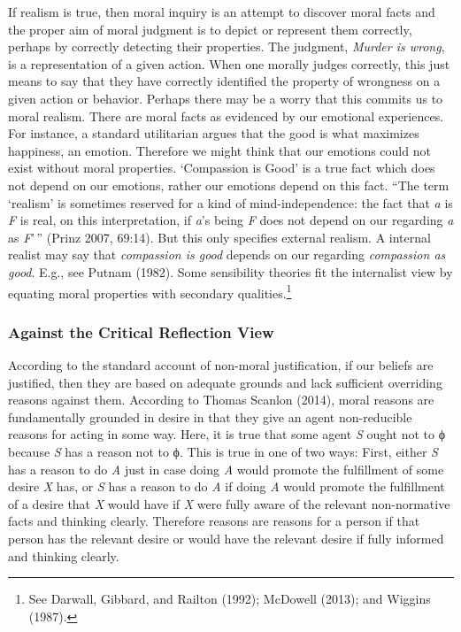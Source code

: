 \documentclass[
  letterpaper,
  DIV=11,
  numbers=noendperiod]{scrartcl}
\theoremstyle{remark}
\begin{document}
If realism is true, then moral inquiry is an attempt to discover moral
facts and the proper aim of moral judgment is to depict or represent
them correctly, perhaps by correctly detecting their properties. The
judgment, \emph{Murder is wrong}, is a representation of a given action.
When one morally judges correctly, this just means to say that they have
correctly identified the property of wrongness on a given action or
behavior. Perhaps there may be a worry that this commits us to moral
realism. There are moral facts as evidenced by our emotional
experiences. For instance, a standard utilitarian argues that the good
is what maximizes happiness, an emotion. Therefore we might think that
our emotions could not exist without moral properties. `Compassion is
Good' is a true fact which does not depend on our emotions, rather our
emotions depend on this fact. ``The term `realism' is sometimes reserved
for a kind of mind-independence: the fact that \emph{a} is \emph{F} is
real, on this interpretation, if \emph{a}'s being \emph{F} does not
depend on our regarding \emph{a} as \emph{F}'\,'' (Prinz 2007, 69:14).
But this only specifies external realism. A internal realist may say
that \emph{compassion is good} depends on our regarding \emph{compassion
as good}. E.g., see Putnam (1982). Some sensibility theories fit the
internalist view by equating moral properties with secondary
qualities.\footnote{See Darwall, Gibbard, and Railton (1992); McDowell
  (2013); and Wiggins (1987).}

\subsubsection{Against the Critical Reflection
View}\label{against-the-critical-reflection-view}

According to the standard account of non-moral justification, if our
beliefs are justified, then they are based on adequate grounds and lack
sufficient overriding reasons against them. According to Thomas Scanlon
(2014), moral reasons are fundamentally grounded in desire in that they
give an agent non-reducible reasons for acting in some way. Here, it is
true that some agent \emph{S} ought not to ϕ because \emph{S} has a
reason not to ϕ. This is true in one of two ways: First, either \emph{S}
has a reason to do \emph{A} just in case doing \emph{A} would promote
the fulfillment of some desire \emph{X} has, or \emph{S} has a reason to
do \emph{A} if doing \emph{A} would promote the fulfillment of a desire
that \emph{X} would have if \emph{X} were fully aware of the relevant
non-normative facts and thinking clearly. Therefore reasons are reasons
for a person if that person has the relevant desire or would have the
relevant desire if fully informed and thinking clearly.
\end{document}
